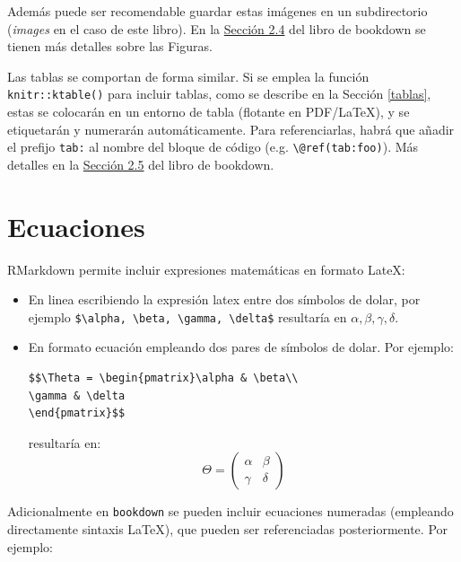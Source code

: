 \documentclass[]{book}
\theoremstyle{definition}
\theoremstyle{definition}
\theoremstyle{definition}
\theoremstyle{remark}
\begin{document}
Además puede ser recomendable guardar estas imágenes en un subdirectorio
(\emph{images} en el caso de este libro). En la
\href{https://bookdown.org/yihui/bookdown/figures.html}{Sección 2.4} del
libro de bookdown se tienen más detalles sobre las Figuras.

Las tablas se comportan de forma similar. Si se emplea la función
\texttt{knitr::ktable()} para incluir tablas, como se describe en la
Sección \ref{tablas}, estas se colocarán en un entorno de tabla
(flotante en PDF/LaTeX), y se etiquetarán y numerarán automáticamente.
Para referenciarlas, habrá que añadir el prefijo \texttt{tab:} al nombre
del bloque de código (e.g. \texttt{\textbackslash{}@ref(tab:foo)}). Más
detalles en la
\href{https://bookdown.org/yihui/bookdown/tables.html}{Sección 2.5} del
libro de bookdown.

\section{Ecuaciones}\label{ecuaciones}

RMarkdown permite incluir expresiones matemáticas en formato LateX:

\begin{itemize}
\item
  En linea escribiendo la expresión latex entre dos símbolos de dolar,
  por ejemplo
  \texttt{\$\textbackslash{}alpha,\ \textbackslash{}beta,\ \textbackslash{}gamma,\ \textbackslash{}delta\$}
  resultaría en \(\alpha, \beta, \gamma, \delta\).
\item
  En formato ecuación empleando dos pares de símbolos de dolar. Por
  ejemplo:

\begin{verbatim}
$$\Theta = \begin{pmatrix}\alpha & \beta\\
\gamma & \delta
\end{pmatrix}$$
\end{verbatim}

  resultaría en: \[\Theta = \begin{pmatrix}\alpha & \beta\\
  \gamma & \delta
  \end{pmatrix}\]
\end{itemize}

Adicionalmente en \texttt{bookdown} se pueden incluir ecuaciones
numeradas (empleando directamente sintaxis LaTeX), que pueden ser
referenciadas posteriormente. Por ejemplo:
\end{document}
